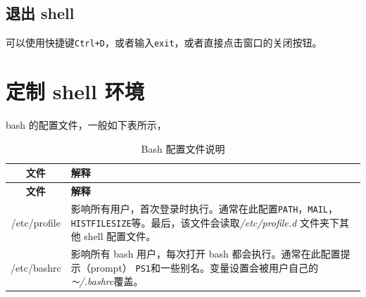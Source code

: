 \documentclass[doctor,openright,twoside]{sjtuthesis}
\newcommand{\passthrough}[1]{#1}
\theoremstyle{plain}
\theoremstyle{definition}
\theoremstyle{remark}
\theoremstyle{ocrenumbox}
\theoremstyle{plain}
\begin{document}
\hypertarget{-shell}{%
\subsection{退出 shell}\label{-shell}}

可以使用快捷键\passthrough{\lstinline!Ctrl+D!}，或者输入\passthrough{\lstinline!exit!}，或者直接点击窗口的关闭按钮。

\hypertarget{-shell-}{%
\section{定制 shell 环境}\label{-shell-}}

bash 的配置文件，一般如下表所示，

\begin{longtable}[]{@{}cl@{}}
\caption{Bash 配置文件说明}\tabularnewline
\toprule
\begin{minipage}[b]{0.20\columnwidth}\centering
\textbf{文件}\strut
\end{minipage} & \begin{minipage}[b]{0.74\columnwidth}\raggedright
\textbf{解释}\strut
\end{minipage}\tabularnewline
\midrule
\endfirsthead
\toprule
\begin{minipage}[b]{0.20\columnwidth}\centering
\textbf{文件}\strut
\end{minipage} & \begin{minipage}[b]{0.74\columnwidth}\raggedright
\textbf{解释}\strut
\end{minipage}\tabularnewline
\midrule
\endhead
\begin{minipage}[t]{0.20\columnwidth}\centering
/etc/profile\strut
\end{minipage} & \begin{minipage}[t]{0.74\columnwidth}\raggedright
影响所有用户，首次登录时执行。通常在此配置\passthrough{\lstinline!PATH!}，\passthrough{\lstinline!MAIL!}，\passthrough{\lstinline!HISTFILESIZE!}等。最后，该文件会读取\emph{/etc/profile.d}
文件夹下其他 shell 配置文件。\strut
\end{minipage}\tabularnewline
\begin{minipage}[t]{0.20\columnwidth}\centering
/etc/bashrc\strut
\end{minipage} & \begin{minipage}[t]{0.74\columnwidth}\raggedright
影响所有 bash 用户，每次打开 bash 都会执行。通常在此配置提示（prompt）
\passthrough{\lstinline!PS1!}和一些别名。变量设置会被用户自己的
\emph{\passthrough{\lstinline!～!}/.bashrc}覆盖。\strut

\end{minipage}
\end{longtable}
\end{document}
